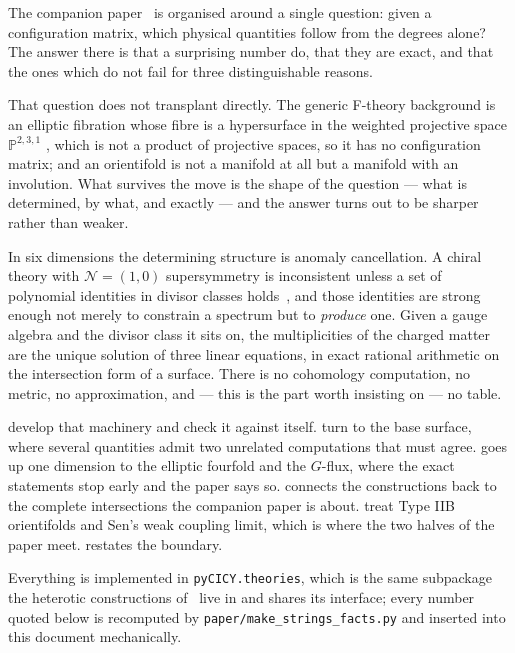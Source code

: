 \documentclass[11pt,a4paper]{article}
\newcommand{\PP}{\mathbb{P}}
\theoremstyle{definition}
\begin{document}
The companion paper~\cite{SuppMath} is organised around a single question:
given a configuration matrix, which physical quantities follow from the
degrees alone? The answer there is that a surprising number do, that they are
exact, and that the ones which do not fail for three distinguishable reasons.

That question does not transplant directly. The generic F-theory background is
an elliptic fibration whose fibre is a hypersurface in the weighted projective
space $\PP^{2,3,1}$ \cite{Vafa1996, MorrisonVafaI, MorrisonVafaII}, 
which is not a product of projective spaces, so it has no
configuration matrix; and an orientifold is not a manifold at all but a
manifold with an involution. What survives the move is the shape of the
question --- what is determined, by what, and exactly --- and the answer turns
out to be sharper rather than weaker.

In six dimensions the determining structure is anomaly cancellation. A chiral
theory with $\mathcal{N}=(1,0)$ supersymmetry is inconsistent unless a set of
polynomial identities in divisor classes holds~\cite{GSW1985,Sagnotti1992,
Erler1994,KumarMorrisonTaylor2010}, and those identities are strong enough not
merely to constrain a spectrum but to \emph{produce} one. Given a gauge
algebra and the divisor class it sits on, the multiplicities of the charged
matter are the unique solution of three linear equations, in exact rational
arithmetic on the intersection form of a surface. There is no cohomology
computation, no metric, no approximation, and --- this is the part worth
insisting on --- no table.

 develop that machinery
and check it against itself.  turn to the base
surface, where several quantities admit two unrelated computations that must
agree.  goes up one dimension to the elliptic fourfold and the
$G$-flux, where the exact statements stop early and the paper says so.
 connects the constructions back to the complete intersections
the companion paper is about.  treat Type IIB
orientifolds and Sen's weak coupling limit, which is where the two halves of
the paper meet.  restates the boundary.

Everything is implemented in \texttt{pyCICY.theories}, which is the same
subpackage the heterotic constructions of~\cite{SuppMath} live in and shares
its interface; every number quoted below is recomputed by
\texttt{paper/make\_strings\_facts.py} and inserted into this document
mechanically.
\end{document}
